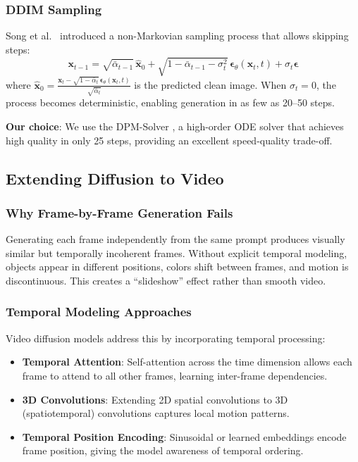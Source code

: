 \documentclass[conference]{IEEEtran}
\begin{document}
\subsubsection{DDIM Sampling}
Song et al.\ \cite{song2020ddim} introduced a non-Markovian sampling process that allows skipping steps:
\begin{equation}
    \mathbf{x}_{t-1} = \sqrt{\bar{\alpha}_{t-1}}\,\hat{\mathbf{x}}_0 + \sqrt{1 - \bar{\alpha}_{t-1} - \sigma_t^2}\,\boldsymbol{\epsilon}_\theta(\mathbf{x}_t, t) + \sigma_t \boldsymbol{\epsilon}
\end{equation}
where $\hat{\mathbf{x}}_0 = \frac{\mathbf{x}_t - \sqrt{1-\bar{\alpha}_t}\,\boldsymbol{\epsilon}_\theta(\mathbf{x}_t,t)}{\sqrt{\bar{\alpha}_t}}$ is the predicted clean image. When $\sigma_t = 0$, the process becomes deterministic, enabling generation in as few as 20--50 steps.

\textbf{Our choice}: We use the DPM-Solver \cite{lu2022dpm}, a high-order ODE solver that achieves high quality in only 25 steps, providing an excellent speed-quality trade-off.

\subsection{Extending Diffusion to Video}

\subsubsection{Why Frame-by-Frame Generation Fails}
Generating each frame independently from the same prompt produces visually similar but temporally incoherent frames. Without explicit temporal modeling, objects appear in different positions, colors shift between frames, and motion is discontinuous. This creates a ``slideshow'' effect rather than smooth video.

\subsubsection{Temporal Modeling Approaches}
Video diffusion models address this by incorporating temporal processing:
\begin{itemize}
    \item \textbf{Temporal Attention}: Self-attention across the time dimension allows each frame to attend to all other frames, learning inter-frame dependencies.
    \item \textbf{3D Convolutions}: Extending 2D spatial convolutions to 3D (spatiotemporal) convolutions captures local motion patterns.
    \item \textbf{Temporal Position Encoding}: Sinusoidal or learned embeddings encode frame position, giving the model awareness of temporal ordering.
\end{itemize}
\end{document}
